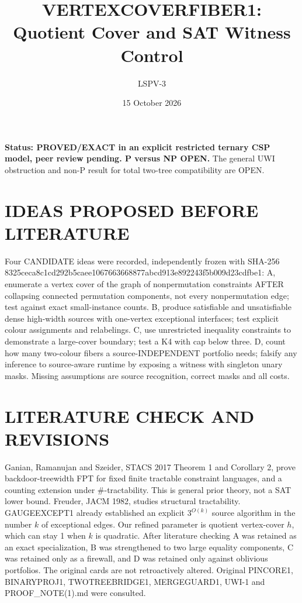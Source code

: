 \documentclass{article}
\title{VERTEXCOVERFIBER1: Quotient Cover and SAT Witness Control}
\author{LSPV-3}
\date{15 October 2026}
\begin{document}
\maketitle
\noindent\textbf{Status: PROVED/EXACT in an explicit restricted ternary CSP model, peer review pending. P versus NP OPEN.} The general UWI obstruction and non-P result for total two-tree compatibility are OPEN.

\section{IDEAS PROPOSED BEFORE LITERATURE}
Four CANDIDATE ideas were recorded, independently frozen with SHA-256 8325ceca8c1cd292b5caee1067663668877abcd913e892243f5b009d23cdfbe1: A, enumerate a vertex cover of the graph of nonpermutation constraints AFTER collapsing connected permutation components, not every nonpermutation edge; test against exact small-instance counts. B, produce satisfiable and unsatisfiable dense high-width sources with one-vertex exceptional interfaces; test explicit colour assignments and relabelings. C, use unrestricted inequality constraints to demonstrate a large-cover boundary; test a K4 with cap below three. D, count how many two-colour fibers a source-INDEPENDENT portfolio needs; falsify any inference to source-aware runtime by exposing a witness with singleton unary masks. Missing assumptions are source recognition, correct masks and all costs.

\section{LITERATURE CHECK AND REVISIONS}
Ganian, Ramanujan and Szeider, STACS 2017 Theorem 1 and Corollary 2, prove backdoor-treewidth FPT for fixed finite tractable constraint languages, and a counting extension under \#-tractability. This is general prior theory, not a SAT lower bound. Freuder, JACM 1982, studies structural tractability. GAUGEEXCEPT1 already established an explicit $3^{O(k)}$ source algorithm in the number $k$ of exceptional edges. Our refined parameter is quotient vertex-cover $h$, which can stay 1 when $k$ is quadratic. After literature checking A was retained as an exact specialization, B was strengthened to two large equality components, C was retained only as a firewall, and D was retained only against oblivious portfolios. The original cards are not retroactively altered. Original PINCORE1, BINARYPROJ1, TWOTREEBRIDGE1, MERGEGUARD1, UWI-1 and PROOF_NOTE(1).md were consulted.
\end{document}
